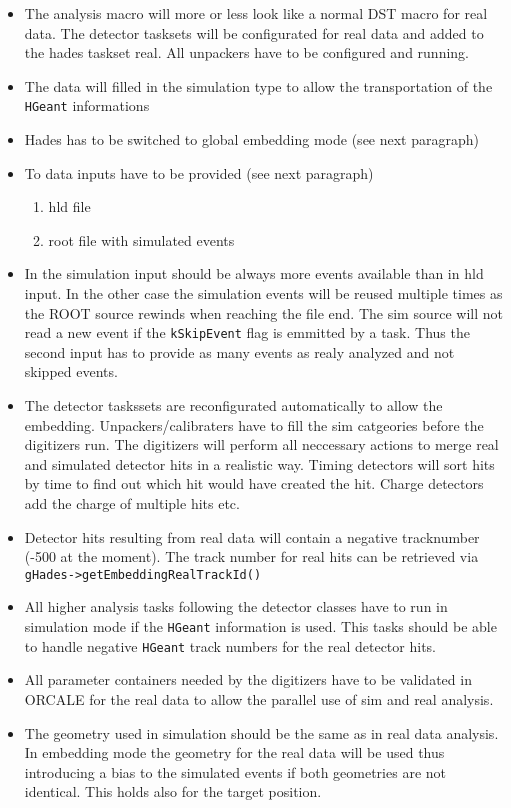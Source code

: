 \begin{itemize}
    \item The analysis macro will more or less look like a normal DST 
    macro for real data. The detector tasksets will be configurated 
    for real data and added to the hades taskset real. All unpackers 
    have to be configured and running.
    \item The data will filled in the simulation type to allow the 
    transportation of the \verb+HGeant+ informations
    \item Hades has to be switched to global embedding mode (see next paragraph)
    \item To data inputs have to be provided (see next paragraph)
         \begin {enumerate}
          \item hld file
          \item root file with simulated events
         \end{enumerate}
    \item In the simulation input should be always more events available 
    than in hld input. In the other case the simulation events will be 
    reused multiple times as the ROOT source rewinds when reaching the 
    file end. The sim source will not read a new event if the \verb+kSkipEvent+ 
    flag is emmitted by a task. Thus the second input has to provide 
    as many events as realy analyzed and not skipped events.
    \item The detector taskssets are reconfigurated automatically to allow 
    the embedding. Unpackers/calibraters have to fill the sim catgeories 
    before the digitizers run. The digitizers will perform all neccessary 
    actions to merge real and simulated detector hits in a realistic way. 
    Timing detectors will sort hits by time to find out which hit would 
    have created the hit. Charge detectors add the charge of multiple hits etc.
    \item Detector hits resulting from real data will contain a 
    negative tracknumber (-500 at the moment). The track number for real 
    hits can be retrieved via \verb+gHades->getEmbeddingRealTrackId()+
    \item All higher analysis tasks following the detector classes have 
    to run in simulation mode if the \verb+HGeant+ information is used. This 
    tasks should be able to handle negative \verb+HGeant+ track numbers 
    for the real detector hits.
    \item All parameter containers needed by the digitizers have to be 
    validated in ORCALE for the real data to allow the parallel use of 
    sim and real analysis.
    \item The geometry used in simulation should be the same as in real 
    data analysis. In embedding mode the geometry for the real data will 
    be used thus introducing a bias to the simulated events if both 
    geometries are not identical. This holds also for the target position.
\end{itemize}

